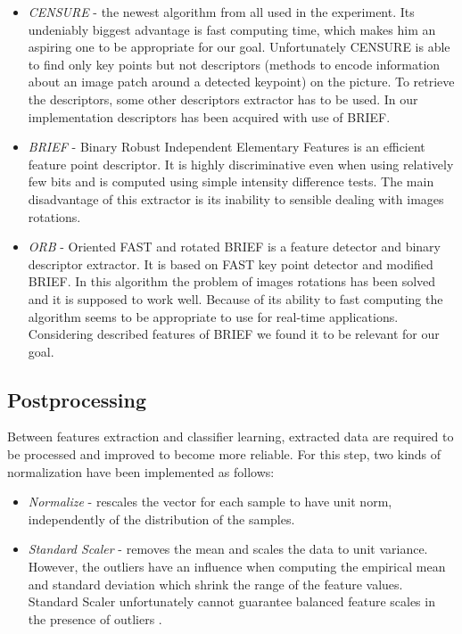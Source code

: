 \documentclass[11pt,a4paper]{article}
\begin{document}
\begin{itemize}
	\item \textit{CENSURE}\cite{CENSURE} - the newest algorithm from all used in the experiment. Its undeniably biggest advantage is fast computing time, which makes him an aspiring one to be appropriate for our goal. Unfortunately CENSURE is able to find only key points but not descriptors (methods to encode information  about  an  image  patch  around  a  detected  keypoint\cite{DESCRIPTORS}) on the picture.  To retrieve the descriptors, some other descriptors extractor has to be used. In our implementation descriptors has been acquired with use of BRIEF. 
	
	\item \textit{BRIEF} - Binary Robust Independent Elementary Features is an efficient feature point descriptor. It is highly discriminative even when using relatively few bits and is computed using simple intensity difference tests\cite{BRIEF}. The main disadvantage of this extractor is its inability to sensible dealing with images rotations.
	
	\item \textit{ORB} - Oriented FAST\cite{FAST} and rotated BRIEF is a feature detector and binary descriptor extractor. It is based on FAST key point detector and modified BRIEF.\cite{ORB} In this algorithm the problem of images rotations has been solved and it is supposed to work well. Because of its ability to fast computing the algorithm seems to be appropriate to use for real-time applications. Considering described features of BRIEF we found it to be relevant for our goal.
\end{itemize}

\subsection{Postprocessing}

Between features extraction and classifier learning, extracted data are required to be processed and improved to become more reliable. For this step, two kinds of normalization have been implemented as follows:

\begin{itemize}
	\item \textit{Normalize}  - rescales the vector for each sample to have unit norm, independently of the distribution of the samples\cite{PREPROCESSING}.
	
	\item \textit{Standard Scaler}  - removes the mean and scales the data to unit variance. However, the outliers have an influence when computing the empirical mean and standard deviation which shrink the range of the feature values. Standard Scaler unfortunately cannot guarantee balanced feature scales in the presence of outliers \cite{PREPROCESSING}.
\end{itemize}
\end{document}
